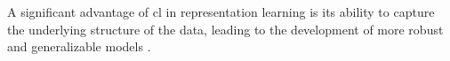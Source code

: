
A significant advantage of \ac{cl} in representation learning is its ability to capture the underlying structure of the data, 
leading to the development of more robust and generalizable models 
\citep{mochi_2020,PIC_2020,swav_2020,local_aggr_2019,grape_2024,CL_temp_2021}.
